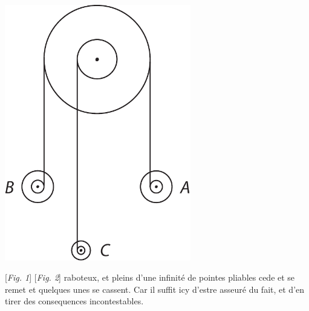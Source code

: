 \hspace*{13,3mm}
\begin{minipage}[c]{0.5\textwidth}
\includegraphics[trim = 0mm -8mm -5mm 0mm, clip, width=0.61\textwidth]{images/lh0350911_005r-d2.pdf}
\end{minipage}
\hspace*{25mm} [\textit{Fig. 1}]\hspace*{57mm} [\textit{Fig. 2}]
\pend
\pstart \noindent raboteux, et pleins d'une infinit\'{e} de pointes pliables 
cede et se remet et quelques unes se cassent.
Car il suffit icy d'estre asseur\'{e} du fait, et d'en tirer des consequences incontestables.
\pend
\count{}
\count{}
